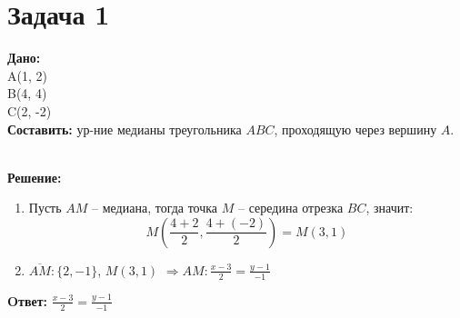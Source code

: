\documentclass{article}
\begin{document}
\section*{Задача 1}
\begin{minipage}[t]{0.45\textwidth}
\textbf{Дано:}\\
A(1, 2)\\
B(4, 4)\\
C(2, -2)\\
\textbf{Составить:} ур-ние медианы треугольника $ABC$, проходящую через вершину $A$.
\end{minipage}
\begin{minipage}[t]{0.45\textwidth}
	\vspace{-\baselineskip} %
\begin{center}
\end{center}
\end{minipage}
\\
\textbf{Решение:}
\begin{enumerate}

\item Пусть $AM$ -- медиана, тогда точка $M$ -- середина отрезка $BC$, значит:
\[
M\left(\frac{4 + 2}{2}, \frac{4 + (-2)}{2}\right) = M(3, 1)
\]

\item $\overline{AM}: \{2, -1\}$, $ M(3,1)$ $\Rightarrow AM: \frac{x-3}{2} = \frac{y-1}{-1}$
\end{enumerate}
\textbf{Oтвет:} $\frac{x-3}{2} = \frac{y-1}{-1}$
\end{document}
